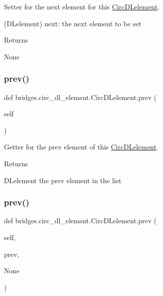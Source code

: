 Setter for the next element for this \hyperlink{classbridges_1_1circ__dl__element_1_1_circ_d_lelement}{Circ\+D\+Lelement}. 

(D\+Lelement) next\+: the next element to be set \begin{DoxyReturn}{Returns}


None 
\end{DoxyReturn}
\mbox{\label{classbridges_1_1circ__dl__element_1_1_circ_d_lelement_aa2ebe17f407680a6a4fc886ef9516d61}} 
\subsubsection{\texorpdfstring{prev()}{prev()}\hspace{0.1cm}{\footnotesize\ttfamily [1/2]}}
{\footnotesize\ttfamily def bridges.\+circ\+\_\+dl\+\_\+element.\+Circ\+D\+Lelement.\+prev (\begin{DoxyParamCaption}\item[{}]{self }\end{DoxyParamCaption})}



Getter for the prev element of this \hyperlink{classbridges_1_1circ__dl__element_1_1_circ_d_lelement}{Circ\+D\+Lelement}. 

\begin{DoxyReturn}{Returns}


D\+Lelement the prev element in the list 
\end{DoxyReturn}
\mbox{\label{classbridges_1_1circ__dl__element_1_1_circ_d_lelement_a5b62548af44a610a2230258fe641d8a2}} 
\subsubsection{\texorpdfstring{prev()}{prev()}\hspace{0.1cm}{\footnotesize\ttfamily [2/2]}}
{\footnotesize\ttfamily def bridges.\+circ\+\_\+dl\+\_\+element.\+Circ\+D\+Lelement.\+prev (\begin{DoxyParamCaption}\item[{}]{self,  }\item[{}]{prev,  }\item[{}]{None }\end{DoxyParamCaption})}



